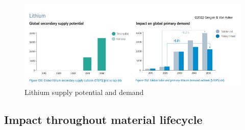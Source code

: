 \documentclass[../summary.tex]{subfiles}
\begin{document}
\begin{figure}[H]
	\centering
	\includegraphics[width=1\linewidth]{../images/Lithium_supply_potential_and_demand}
	\caption{Lithium supply potential and demand}
	\label{fig:lithiumsupplypotentialanddemand}
\end{figure}

\subsection{Impact throughout material lifecycle}
\end{document}
